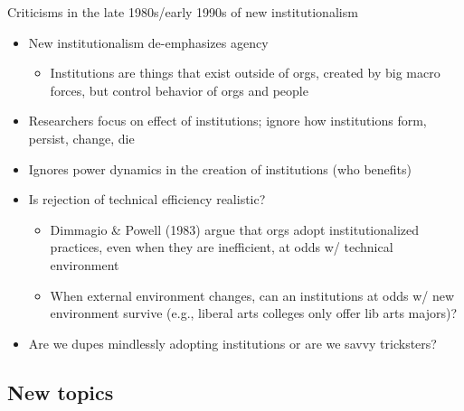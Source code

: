 \begin{frame}{Criticisms in the late 1980s/early 1990s of new institutionalism}

	\begin{itemize}
		\item New institutionalism de-emphasizes agency
		\begin{itemize}
			\item Institutions are things that exist outside of orgs, created by big macro forces, but control behavior of orgs and people
		\end{itemize}	
		\item Researchers focus on effect of institutions; ignore how institutions form, persist, change, die
		\item Ignores power dynamics in the creation of institutions (who benefits)
		\item Is rejection of technical efficiency realistic?
		\begin{itemize}
			\item Dimmagio \& Powell (1983) argue that orgs adopt institutionalized practices, even when they are inefficient, at odds w/ technical environment
			\item When external environment changes, can an institutions at odds w/ new environment survive (e.g., liberal arts colleges only offer lib arts majors)?
		\end{itemize}
		\item Are we dupes mindlessly adopting institutions or are we savvy tricksters?
	\end{itemize}
\end{frame}

\subsection{New topics}

